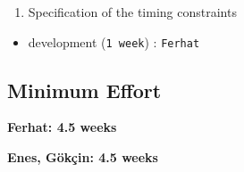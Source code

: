 \documentclass[]{article}
\providecommand{\tightlist}{%
  \setlength{\itemsep}{0pt}\setlength{\parskip}{0pt}}
\begin{document}
\begin{enumerate}
\def\labelenumi{\arabic{enumi}.}
\setcounter{enumi}{4}
\tightlist
\item
  Specification of the timing constraints
\end{enumerate}

\begin{itemize}
\tightlist
\item
  development (\texttt{1\ week}) : \texttt{Ferhat}
\end{itemize}

\hypertarget{minimum-effort}{%
\subsection*{Minimum Effort}\label{minimum-effort}}

\textbf{Ferhat: 4.5 weeks}

\textbf{Enes, Gökçin: 4.5 weeks}


\end{document}
